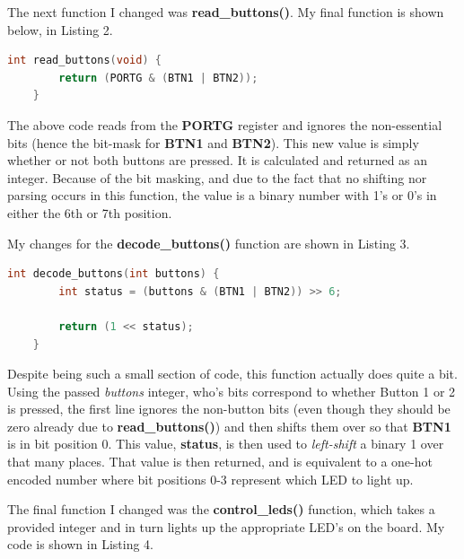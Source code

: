 \documentclass[a4paper, 12pt]{article}
\begin{document}
The next function I changed was \textbf{read\_buttons()}. My final function is shown below, in Listing 2.

	\begin{mdframed}[backgroundcolor=code-gray, roundcorner=10pt,
								innerleftmargin=5, innertopmargin=5, innerbottommargin=5]	
	\begin{lstlisting}[language=C, caption=Button Reading, tabsize=2]
	int read_buttons(void) {
		return (PORTG & (BTN1 | BTN2));
	}
	\end{lstlisting}
	\end{mdframed}
	
The above code reads from the \textbf{PORTG} register and ignores the non-essential bits (hence the bit-mask for \textbf{BTN1} and \textbf{BTN2}). This new value is simply whether or not both buttons are pressed. It is calculated and returned as an integer. Because of the bit masking, and due to the fact that no shifting nor parsing occurs in this function, the value is a binary number with 1's or 0's in either the 6th or 7th position.

My changes for the \textbf{decode\_buttons()} function are shown in Listing 3.

	\begin{mdframed}[backgroundcolor=code-gray, roundcorner=10pt,
								innerleftmargin=5, innertopmargin=5, innerbottommargin=5]	
	\begin{lstlisting}[language=C, caption=Button Decoding, tabsize=2]
	int decode_buttons(int buttons) {
		int status = (buttons & (BTN1 | BTN2)) >> 6;

		return (1 << status);
	}
	\end{lstlisting}
	\end{mdframed}

Despite being such a small section of code, this function actually does quite a bit. Using the passed \textit{buttons} integer, who's bits correspond to whether Button 1 or 2 is pressed, the first line ignores the non-button bits (even though they should be zero already due to \textbf{read\_buttons()}) and then shifts them over so that \textbf{BTN1} is in bit position 0. This value, \textbf{status}, is then used to \textit{left-shift} a binary 1 over that many places. That value is then returned, and is equivalent to a one-hot encoded number where bit positions 0-3 represent which LED to light up.

The final function I changed was the \textbf{control\_leds()} function, which takes a provided integer and in turn lights up the appropriate LED's on the board. My code is shown in Listing 4.
\newpage
\end{document}

